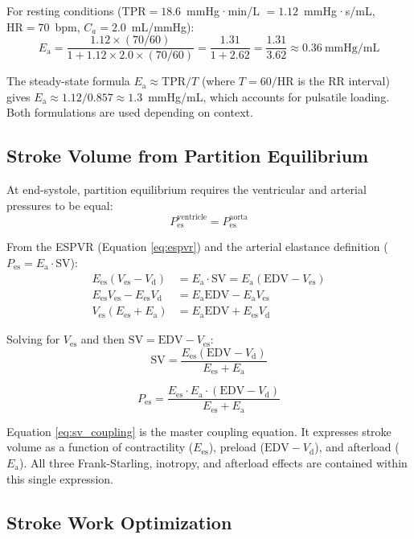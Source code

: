\documentclass[12pt,a4paper]{article}
\theoremstyle{remark}
\newcommand{\Ees}{E_{\mathrm{es}}}
\newcommand{\Ea}{E_{\mathrm{a}}}
\newcommand{\Vd}{V_{\mathrm{d}}}
\newcommand{\Ves}{V_{\mathrm{es}}}
\newcommand{\Pes}{P_{\mathrm{es}}}
\newcommand{\SV}{\mathrm{SV}}
\newcommand{\HR}{\mathrm{HR}}
\newcommand{\TPR}{\mathrm{TPR}}
\newcommand{\EDV}{\mathrm{EDV}}
\begin{document}
For resting conditions ($\TPR = 18.6$~mmHg·min/L $= 1.12$~mmHg·s/mL, $\HR = 70$~bpm, $C_a = 2.0$~mL/mmHg):
\begin{equation}
    \Ea = \frac{1.12 \times (70/60)}{1 + 1.12 \times 2.0 \times (70/60)} = \frac{1.31}{1 + 2.62} = \frac{1.31}{3.62} \approx 0.36~\text{mmHg/mL}
\end{equation}

The steady-state formula $\Ea \approx \TPR/T$ (where $T = 60/\HR$ is the RR interval) gives $\Ea \approx 1.12/0.857 \approx 1.3$~mmHg/mL, which accounts for pulsatile loading. Both formulations are used depending on context.

\subsection{Stroke Volume from Partition Equilibrium}

At end-systole, partition equilibrium requires the ventricular and arterial pressures to be equal:
\begin{equation}
    \Pes^{\mathrm{ventricle}} = \Pes^{\mathrm{aorta}}
\end{equation}

From the ESPVR (Equation \ref{eq:espvr}) and the arterial elastance definition ($\Pes = \Ea \cdot \SV$):
\begin{align}
    \Ees(\Ves - \Vd) &= \Ea \cdot \SV = \Ea(\EDV - \Ves) \\
    \Ees \Ves - \Ees \Vd &= \Ea \EDV - \Ea \Ves \\
    \Ves(\Ees + \Ea) &= \Ea \EDV + \Ees \Vd
\end{align}

Solving for $\Ves$ and then $\SV = \EDV - \Ves$:
\begin{equation}
    \boxed{\SV = \frac{\Ees(\EDV - \Vd)}{\Ees + \Ea}}
    \label{eq:sv_coupling}
\end{equation}

\begin{equation}
    \boxed{\Pes = \frac{\Ees \cdot \Ea \cdot (\EDV - \Vd)}{\Ees + \Ea}}
    \label{eq:pes_coupling}
\end{equation}

Equation \ref{eq:sv_coupling} is the master coupling equation. It expresses stroke volume as a function of contractility ($\Ees$), preload ($\EDV - \Vd$), and afterload ($\Ea$). All three Frank-Starling, inotropy, and afterload effects are contained within this single expression.

\subsection{Stroke Work Optimization}
\end{document}
